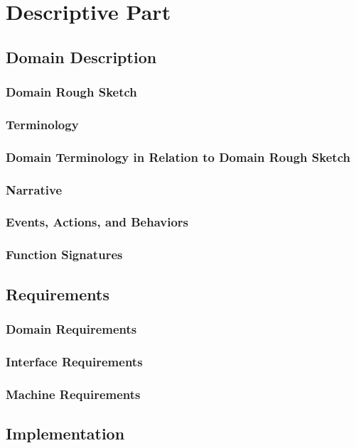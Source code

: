 \chapter{Descriptive Part}
\newpage
\section{Domain Description}
\subsection{Domain Rough Sketch}
\subsection{Terminology}
\subsection{Domain Terminology in Relation to Domain Rough Sketch}
\subsection{Narrative}
\subsection{Events, Actions, and Behaviors}
\subsection{Function Signatures}
\newpage
\section{Requirements}
\subsection{Domain Requirements}
\subsection{Interface Requirements}
\subsection{Machine Requirements}
\section{Implementation}
